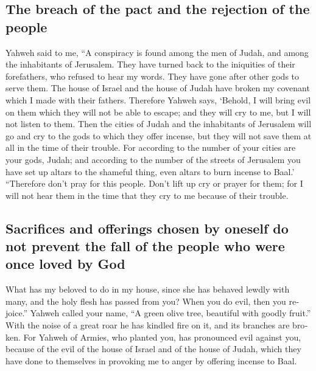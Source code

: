 \begin{paracol}{2}
\begin{otherlanguage}{english}
\hypertarget{the-breach-of-the-pact-and-the-rejection-of-the-people}{%
\subsection{The breach of the pact and the rejection of the
people}\label{the-breach-of-the-pact-and-the-rejection-of-the-people}}

 Yahweh said to me, ``A conspiracy is found among the men
of Judah, and among the inhabitants of Jerusalem.  They
have turned back to the iniquities of their forefathers, who refused to
hear my words. They have gone after other gods to serve them. The house
of Israel and the house of Judah have broken my covenant which I made
with their fathers.  Therefore Yahweh says, `Behold, I
will bring evil on them which they will not be able to escape; and they
will cry to me, but I will not listen to them.  Then the
cities of Judah and the inhabitants of Jerusalem will go and cry to the
gods to which they offer incense, but they will not save them at all in
the time of their trouble.  For according to the number
of your cities are your gods, Judah; and according to the number of the
streets of Jerusalem you have set up altars to the shameful thing, even
altars to burn incense to Baal.'  ``Therefore don't pray
for this people. Don't lift up cry or prayer for them; for I will not
hear them in the time that they cry to me because of their trouble.

\hypertarget{sacrifices-and-offerings-chosen-by-oneself-do-not-prevent-the-fall-of-the-people-who-were-once-loved-by-god}{%
\subsection{Sacrifices and offerings chosen by oneself do not prevent
the fall of the people who were once loved by
God}\label{sacrifices-and-offerings-chosen-by-oneself-do-not-prevent-the-fall-of-the-people-who-were-once-loved-by-god}}

 What has my beloved to do in my house, since she has
behaved lewdly with many, and the holy flesh has passed from you? When
you do evil, then you rejoice.''  Yahweh called your
name, ``A green olive tree, beautiful with goodly fruit.'' With the
noise of a great roar he has kindled fire on it, and its branches are
broken.  For Yahweh of Armies, who planted you, has
pronounced evil against you, because of the evil of the house of Israel
and of the house of Judah, which they have done to themselves in
provoking me to anger by offering incense to Baal.


\end{otherlanguage}
\end{paracol}
